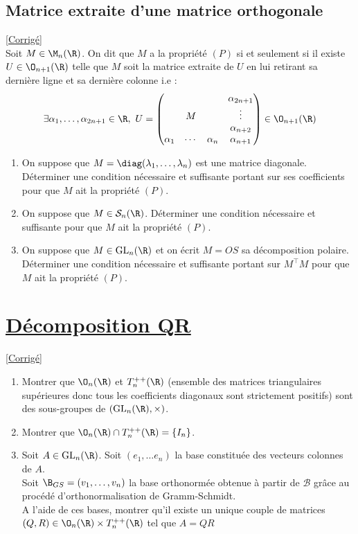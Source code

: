 \documentclass[8pt]{book}
\begin{document}
\subsection{Matrice extraite d'une matrice orthogonale}
\label{Matrice extraite d'une matrice orthogonale}
\textcolor{blue}{\hyperref[Matrice extraite d'une matrice orthogonale corrigé]{[Corrigé]}}\\
Soit $M\in \M_n(\R)$. On dit que $M$ a la propriété $(P)$ si et seulement si il existe $U\in \O_{n+1}(\R)$ telle que $M$ soit la matrice extraite de $U$ en lui retirant sa dernière ligne et sa dernière colonne i.e :
$$\exists \alpha_1,\dots,\alpha_{2n+1}\in \R,\ U=\begin{pmatrix}
	&&&\alpha_{2n+1}\\
	&M&&\vdots\\
	&&&\alpha_{n+2}\\
	\alpha_1&\cdots&\alpha_n&\alpha_{n+1}
\end{pmatrix}\in \O_{n+1}(\R)$$
\begin{enumerate}
	\item On suppose que $M=\diag(\lambda_1,\dots,\lambda_n)$ est une matrice diagonale. Déterminer une condition nécessaire et suffisante portant sur ses coefficients pour que $M$ ait la propriété $(P)$.
	\item On suppose que $M\in \mathcal S_n(\R)$. Déterminer une condition nécessaire et suffisante pour que $M$ ait la propriété $(P)$.
	\item On suppose que $M\in \text{GL}_n(\R)$ et on écrit $M=OS$ sa décomposition polaire. Déterminer une condition nécessaire et suffisante portant sur $M^\top M$ pour que $M$ ait la propriété $(P)$.
\end{enumerate}

\section{\underline{Décomposition QR} }
\label{Décomposition QR}
\textcolor{blue}{\hyperref[Décomposition QR corrigé]{[Corrigé]}}\\
\begin{enumerate}[leftmargin=*]
	\item Montrer que $\O_n(\R)$ et $T_n^{++}(\R)$ (ensemble des matrices triangulaires supérieures donc tous les coefficients diagonaux sont strictement positifs) sont des sous-groupes de $(\text{GL}_n(\R),\times)$.
	\item Montrer que $\O_n(\R)\cap T_n^{++}(\R)=\{I_n\}$.
	\item Soit $A\in \text{GL}_n(\R)$. Soit $(e_1,\dots e_n)$ la base constituée des vecteurs colonnes de $A$.
	\\Soit $\B_{GS}=(v_1,\dots,v_n)$ la base orthonormée obtenue à partir de $\mathcal{B}$ grâce au procédé d'orthonormalisation de Gramm-Schmidt.
	\\ A l'aide de ces bases, montrer qu'il existe un unique couple de matrices $(Q,R)\in \O_n(\R)\times T_n^{++}(\R)$ tel que $A=QR$
\end{enumerate}
\end{document}
